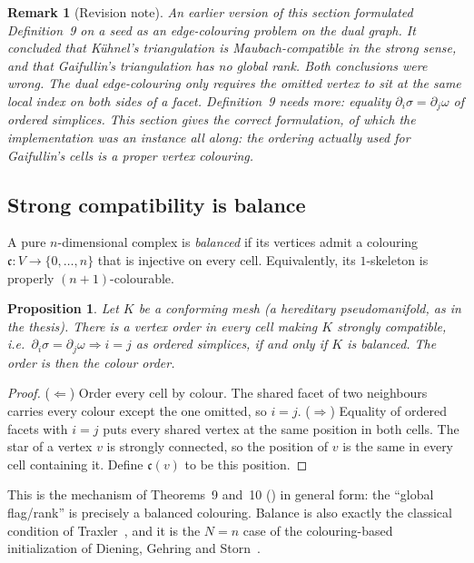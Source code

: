 \documentclass[11pt]{article}
\newtheorem*{propthm}{Proposition}
\newtheorem*{remthm}{Remark}
\newcommand{\col}{\mathfrak{c}}
\begin{document}
\begin{remthm}[Revision note]
An earlier version of this section formulated Definition~9 on a seed as
an \emph{edge}-colouring problem on the dual graph. It concluded that
Kühnel's triangulation is Maubach-compatible in the strong sense, and
that Gaifullin's triangulation has no global rank. Both conclusions were
wrong. The dual edge-colouring only requires the omitted vertex to sit at
the same local \emph{index} on both sides of a facet. Definition~9 needs
more: equality $\partial_i\sigma=\partial_j\omega$ of \emph{ordered}
simplices. This section gives the correct formulation, of which the
implementation was an instance all along: the ordering actually used for
Gaifullin's cells is a proper vertex colouring.
\end{remthm}

\subsection{Strong compatibility is balance}

A pure $n$-dimensional complex is \emph{balanced} if its vertices admit a
colouring $\col:V\to\{0,\dots,n\}$ that is injective on every cell.
Equivalently, its $1$-skeleton is properly $(n{+}1)$-colourable.

\begin{propthm}
Let $K$ be a conforming mesh (a hereditary pseudomanifold, as in the
thesis). There is a vertex order in every cell making $K$ strongly
compatible, i.e.\ $\partial_i\sigma=\partial_j\omega\Rightarrow i=j$ as
ordered simplices, if and only if $K$ is balanced. The order is then the
colour order.
\end{propthm}

\begin{proof}
($\Leftarrow$) Order every cell by colour. The shared facet of two
neighbours carries every colour except the one omitted, so $i=j$.
($\Rightarrow$) Equality of ordered facets with $i=j$ puts every shared
vertex at the same position in both cells. The star of a vertex $v$ is
strongly connected, so the position of $v$ is the same in every cell
containing it. Define $\col(v)$ to be this position.
\end{proof}

This is the mechanism of Theorems~9 and~10 () in
general form: the ``global flag/rank'' is precisely a balanced colouring.
Balance is also exactly the classical condition of
Traxler~\cite{traxler1997}, and it is the $N=n$ case of the colouring-based
initialization of Diening, Gehring and Storn~\cite{dgs2025}.
\end{document}
